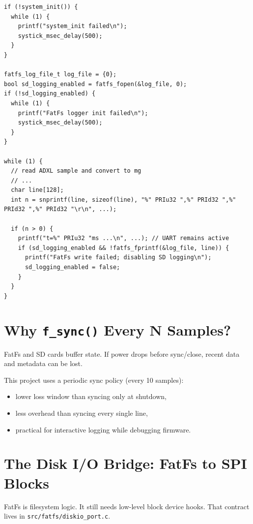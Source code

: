 \begin{lstlisting}[style=cstyle,caption={Main FatFs logging flow (condensed from src/main.c)}]
if (!system_init()) {
  while (1) {
    printf("system_init failed\n");
    systick_msec_delay(500);
  }
}

fatfs_log_file_t log_file = {0};
bool sd_logging_enabled = fatfs_fopen(&log_file, 0);
if (!sd_logging_enabled) {
  while (1) {
    printf("FatFs logger init failed\n");
    systick_msec_delay(500);
  }
}

while (1) {
  // read ADXL sample and convert to mg
  // ...
  char line[128];
  int n = snprintf(line, sizeof(line), "%" PRIu32 ",%" PRId32 ",%" PRId32 ",%" PRId32 "\r\n", ...);

  if (n > 0) {
    printf("t=%" PRIu32 "ms ...\n", ...); // UART remains active
    if (sd_logging_enabled && !fatfs_fprintf(&log_file, line)) {
      printf("FatFs write failed; disabling SD logging\n");
      sd_logging_enabled = false;
    }
  }
}
\end{lstlisting}

\section{Why \texttt{f\_sync()} Every N Samples?}

FatFs and SD cards buffer state. If power drops before sync/close,
recent data and metadata can be lost.

This project uses a periodic sync policy (every 10 samples):
\begin{itemize}[leftmargin=*]
\item lower loss window than syncing only at shutdown,
\item less overhead than syncing every single line,
\item practical for interactive logging while debugging firmware.
\end{itemize}

\section{The Disk I/O Bridge: FatFs to SPI Blocks}

FatFs is filesystem logic. It still needs low-level block device hooks.
That contract lives in \texttt{src/fatfs/diskio\_port.c}.

